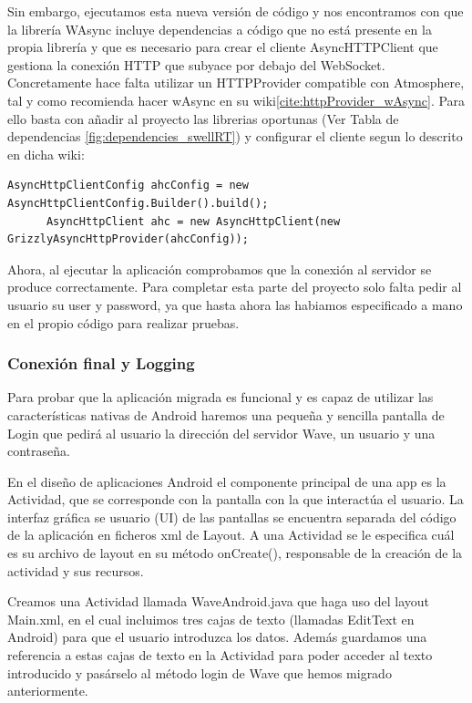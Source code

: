 	Sin embargo, ejecutamos esta nueva versión de código y nos encontramos con que la librería WAsync incluye dependencias a código que no está presente en la propia librería y que es necesario para crear el cliente AsyncHTTPClient que gestiona la conexión HTTP que subyace por debajo del WebSocket. Concretamente hace falta utilizar un HTTPProvider compatible con Atmosphere, tal y como recomienda hacer wAsync en su wiki\ref{cite:httpProvider_wAsync}. Para ello basta con añadir al proyecto las librerias oportunas (Ver Tabla de dependencias \ref{fig:dependencies_swellRT}) y configurar el cliente segun lo descrito en dicha wiki:
		
	  \begin{lstlisting}[frame=single]	
	  AsyncHttpClientConfig ahcConfig = new AsyncHttpClientConfig.Builder().build();
	  AsyncHttpClient ahc = new AsyncHttpClient(new GrizzlyAsyncHttpProvider(ahcConfig));
	  \end{lstlisting}
      
      Ahora, al ejecutar la aplicación comprobamos que la conexión al servidor se produce correctamente. Para completar esta parte del proyecto solo falta pedir al usuario su user y password, ya que hasta ahora las habiamos especificado a mano en el propio código para realizar pruebas.
	    
    		\subsubsection{Conexión final y Logging}
    
    Para probar que la aplicación migrada es funcional y es capaz de utilizar las características nativas de Android haremos una pequeña y sencilla pantalla de Login que pedirá al usuario la dirección del servidor Wave, un usuario y una contraseña.
    
    En el diseño de aplicaciones Android el componente principal de una app es la Actividad, que se corresponde con la pantalla con la que interactúa el usuario. La interfaz gráfica se usuario (UI) de las pantallas se encuentra separada del código de la aplicación en ficheros xml de Layout\cite{ref:android_layout}. A una Actividad se le especifica cuál es su archivo de layout en su método onCreate(), responsable de la creación de la actividad y sus recursos. 
    
    Creamos una Actividad llamada WaveAndroid.java que haga uso del layout Main.xml, en el cual incluimos tres cajas de texto (llamadas EditText en Android) para que el usuario introduzca los datos. Además guardamos una referencia a estas cajas de texto en la Actividad para poder acceder al texto introducido y pasárselo al método login de Wave que hemos migrado anteriormente.
    
